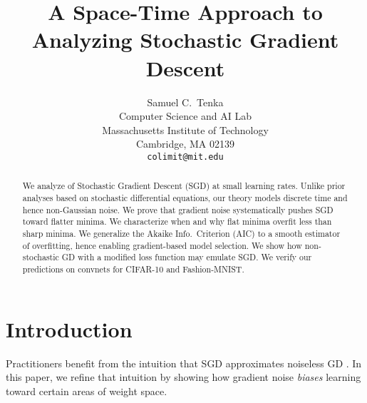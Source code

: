 \documentclass{article}
\title{%
    A Space-Time Approach to Analyzing Stochastic Gradient Descent
}
\author{%
    Samuel C.~Tenka \\
    Computer Science and AI Lab \\
    Massachusetts Institute of Technology \\
    Cambridge, MA 02139 \\
    \texttt{colimit@mit.edu}
}
\theoremstyle{plain}
\theoremstyle{definition}
\begin{document}
    \maketitle
    
    
    \begin{abstract}
        We analyze of Stochastic Gradient Descent (SGD) at small learning rates.
        Unlike prior analyses based on stochastic differential equations, our
        theory models discrete time and hence non-Gaussian noise.
        We prove that gradient noise systematically pushes SGD toward flatter
        minima.  We characterize when and why flat minima overfit less than sharp
        minima.  We generalize the Akaike Info.\ Criterion (AIC) to a smooth
        estimator of overfitting, hence enabling gradient-based model selection.
        We show how non-stochastic GD with a modified loss function may emulate
        SGD.
        We verify our predictions on convnets for CIFAR-10 and Fashion-MNIST.
    \end{abstract}
    

\section{Introduction}



    Practitioners benefit from the intuition that SGD approximates noiseless
    GD \cite{bo91}.  In this paper, we refine that intuition by showing
    how gradient noise \emph{biases} learning toward certain areas of weight
    space.
    
\end{document}
